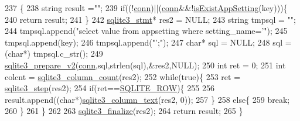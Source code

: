 \begin{DoxyCode}
237                                                    \{
238                 \textcolor{keywordtype}{string} result =\textcolor{stringliteral}{""};
239                 \textcolor{keywordflow}{if}((!\hyperlink{class_tetris_1_1_d_b_management_1_1_d_b_manager_acc2c19420c2b1b1b2c1e724b3a8ec4b7}{conn})||(\hyperlink{class_tetris_1_1_d_b_management_1_1_d_b_manager_acc2c19420c2b1b1b2c1e724b3a8ec4b7}{conn}&&!\hyperlink{class_tetris_1_1_d_b_management_1_1_d_b_manager_aa80722572c33389c1c73f88de9f199b6}{isExistAppSetting}(key)))\{
240                     \textcolor{keywordflow}{return} result;
241                 \}
242                 \hyperlink{sqlite3_8h_af2a033da1327cdd77f0a174a09aedd0c}{sqlite3\_stmt}* res2 = NULL;
243                 \textcolor{keywordtype}{string} tmpsql = \textcolor{stringliteral}{""};
244                 tmpsql.append(\textcolor{stringliteral}{"select value from appsetting where setting\_name='"});
245                 tmpsql.append(key);
246                 tmpsql.append(\textcolor{stringliteral}{"';"});
247                 \textcolor{keywordtype}{char}* sql = NULL;
248                 sql =(\textcolor{keywordtype}{char}*) tmpsql.c\_str();
249                 \hyperlink{sqlite3_8h_a85d4203bb54c984c5325c2f5b3664985}{sqlite3\_prepare\_v2}(\hyperlink{class_tetris_1_1_d_b_management_1_1_d_b_manager_acc2c19420c2b1b1b2c1e724b3a8ec4b7}{conn},sql,strlen(sql),&res2,NULL);
250                 \textcolor{keywordtype}{int} ret = 0;
251                 \textcolor{keywordtype}{int} colcnt = \hyperlink{sqlite3_8h_a326cbde878820fd108f5961d5318f585}{sqlite3\_column\_count}(res2);
252                 \textcolor{keywordflow}{while}(\textcolor{keyword}{true})\{
253                     ret = \hyperlink{sqlite3_8h_ac1e491ce36b7471eb28387f7d3c74334}{sqlite3\_step}(res2);
254                     \textcolor{keywordflow}{if}(ret==\hyperlink{sqlite3_8h_a624365823d0b11a99ccb49e9bb5f8fcf}{SQLITE\_ROW})\{
255                         
256                         result.append((\textcolor{keywordtype}{char}*)\hyperlink{sqlite3_8h_a2f04c4c4fcf17f6e866236cce8c0d426}{sqlite3\_column\_text}(res2, 0));
257                     \}
258                     \textcolor{keywordflow}{else}\{
259                         \textcolor{keywordflow}{break};
260                     \}
261                 \}
262 
263                 \hyperlink{sqlite3_8h_a801195c0f771d40bb4be1e40f3b88945}{sqlite3\_finalize}(res2);
264                 \textcolor{keywordflow}{return} result;
265             \}
\end{DoxyCode}
